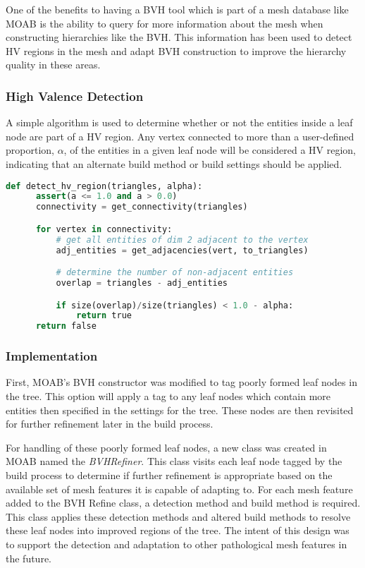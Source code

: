 One of the benefits to having a BVH tool which is part of a mesh database like
MOAB is the ability to query for more information about the mesh when
constructing hierarchies like the BVH. This information has been used to detect
HV regions in the mesh and adapt BVH construction to improve the
hierarchy quality in these areas.

\subsubsection{High Valence Detection}\label{subsubsec:hv_detection}

A simple algorithm is used to determine whether or not the entities inside a
leaf node are part of a HV region. Any vertex connected to more than a
user-defined proportion, $\alpha$, of the entities in a given leaf node will be
considered a HV region, indicating that an alternate build method or build
settings should be applied.

\begin{lstlisting}[language=Python,basicstyle=\tiny,caption={Algorithm for detecting HV regions.},label={alg:hv_detect},captionpos=b]
  def detect_hv_region(triangles, alpha):
      assert(a <= 1.0 and a > 0.0)
      connectivity = get_connectivity(triangles)

      for vertex in connectivity:
          # get all entities of dim 2 adjacent to the vertex
          adj_entities = get_adjacencies(vert, to_triangles)

          # determine the number of non-adjacent entities
          overlap = triangles - adj_entities

          if size(overlap)/size(triangles) < 1.0 - alpha:
              return true
      return false
\end{lstlisting}

\subsubsection{Implementation}\label{subsec:adaptive_construction_implementation}

First, MOAB's BVH constructor was modified to tag poorly
formed leaf nodes in the tree. This option will apply a tag to any leaf nodes
which contain more entities then specified in the settings for the tree. These
nodes are then revisited for further refinement later in the build process.

For handling of these poorly formed leaf nodes, a new class was created in MOAB
named the \textit{BVHRefiner}. This class visits each leaf node tagged by the
build process to determine if further refinement is appropriate based on the
available set of mesh features it is capable of adapting to. For each mesh feature
added to the BVH Refine class, a detection method and build method is
required. This class applies these detection methods and altered build methods
to resolve these leaf nodes into improved regions of the tree. The intent of
this design was to support the detection and adaptation to other pathological mesh
features in the future.

